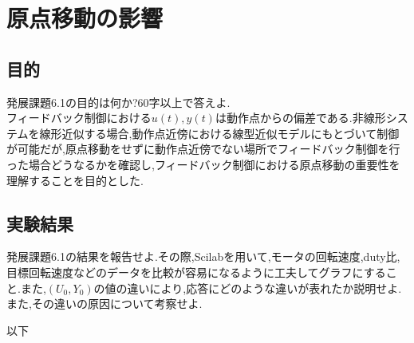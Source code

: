 \documentclass{jarticle}
\begin{document}
\section{原点移動の影響}
\subsection{目的}
発展課題6.1の目的は何か?60字以上で答えよ.\\

フィードバック制御における$u(t),y(t)$は動作点からの偏差である.非線形システムを線形近似する場合,動作点近傍における線型近似モデルにもとづいて制御が可能だが,原点移動をせずに動作点近傍でない場所でフィードバック制御を行った場合どうなるかを確認し,フィードバック制御における原点移動の重要性を理解することを目的とした.

\subsection{実験結果}
発展課題6.1の結果を報告せよ.その際,Scilabを用いて,モータの回転速度,duty比,目標回転速度などのデータを比較が容易になるように工夫してグラフにすること.また,$(U_0,Y_0)$の値の違いにより,応答にどのような違いが表れたか説明せよ.また,その違いの原因について考察せよ.

以下
\end{document}
